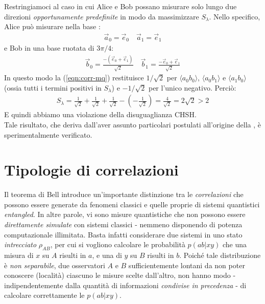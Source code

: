 \documentclass[../../InformazioneQuantistica.tex]{subfiles}
\begin{document}
Restringiamoci al caso in cui Alice e Bob possano misurare solo lungo due direzioni \textit{opportunamente predefinite} in modo da massimizzare $S_\lambda$. Nello specifico, Alice può misurare nella base :
\begin{align*}
\vec{a}_0 = \vec{e}_0 \quad \vec{a}_1 = \vec{e}_1
\end{align*}
e Bob in una base ruotata di $3\pi/4$:
\begin{align*}
\vec{b}_0 = \frac{-(\vec{e}_0 + \vec{e}_1)}{\sqrt{2}} \quad \vec{b}_1 = \frac{-\vec{e}_0+ \vec{e}_1}{\sqrt{2}}
\end{align*}
In questo modo la (\ref{eqn:corr-mq}) restituisce $1/\sqrt{2}$ per $\langle a_0 b_0\rangle$, $\langle a_0 b_1 \rangle$ e $\langle a_1b_0\rangle$ (ossia tutti i termini positivi in $S_\lambda$) e $-1/\sqrt{2}$ per l'unico negativo. Perciò:
\begin{align*}
S_\lambda = \frac{1}{\sqrt{2}} + \frac{1}{\sqrt{2}} + \frac{1}{\sqrt{2}} - \left(-\frac{1}{\sqrt{2}}\right) = \frac{4}{\sqrt{2}} = 2\sqrt{2} > 2
\end{align*}
E quindi abbiamo una violazione della disuguaglianza CHSH.\\
Tale risultato, che deriva dall'aver assunto particolari postulati all'origine della \MQ, è sperimentalmente verificato.

\section{Tipologie di correlazioni}
Il teorema di Bell introduce un'importante distinzione tra le \textit{correlazioni} che possono essere generate da fenomeni classici e quelle proprie di sistemi quantistici \textit{entangled}. In altre parole, vi sono misure quantistiche che non possono essere \textit{direttamente simulate} con sistemi classici - nemmeno disponendo di potenza computazionale illimitata. Basta infatti considerare due sistemi in uno stato \textit{intrecciato} $\rho_{AB}$, per cui si vogliono calcolare le probabilità $p(ab|xy)$ che una misura di $x$ su $A$ risulti in $a$, e una di $y$ su $B$ risulti in $b$. Poiché tale distribuzione è \textit{non separabile}, due osservatori $A$ e $B$ sufficientemente lontani da non poter conoscere (località) ciascuno le misure scelte dall'altro, non hanno modo - indipendentemente dalla quantità di informazioni \textit{condivise in precedenza} - di calcolare correttamente le $p(ab|xy)$.\\
\end{document}
